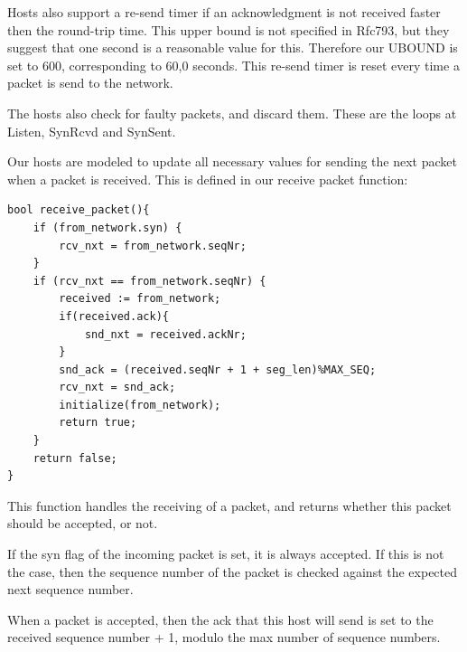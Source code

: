 \documentclass[twocolumn]{article}
\begin{document}
Hosts also support a re-send timer if an acknowledgment is not received faster then the round-trip time. This upper bound is not specified in Rfc793, but they suggest that one second is a reasonable value for this. Therefore our UBOUND is set to 600, corresponding to 60,0 seconds. This re-send timer is reset every time a packet is send to the network.

The hosts also check for faulty packets, and discard them. These are the loops at Listen, SynRcvd and SynSent. 

Our hosts are modeled to update all necessary values for sending the next packet when a packet is received. This is defined in our receive packet function:
\begin{verbatim}
bool receive_packet(){
	if (from_network.syn) {
		rcv_nxt = from_network.seqNr;
	}
	if (rcv_nxt == from_network.seqNr) {
		received := from_network;
		if(received.ack){
			snd_nxt = received.ackNr;
		}
		snd_ack = (received.seqNr + 1 + seg_len)%MAX_SEQ;
		rcv_nxt = snd_ack;
		initialize(from_network);
		return true;
	}
	return false;
}
\end{verbatim}

This function handles the receiving of a packet, and returns whether this packet should be accepted, or not.

If the syn flag of the incoming packet is set, it is always accepted. If this is not the case, then the sequence number of the packet is checked against the expected next sequence number.

When a packet is accepted, then the ack that this host will send is set to the received sequence number + 1, modulo the max number of sequence numbers.
\end{document}
